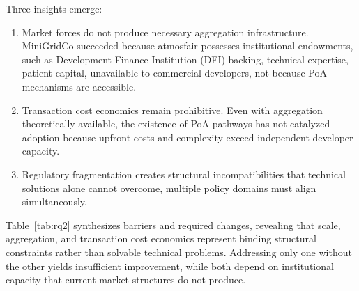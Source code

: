 Three insights emerge:
\begin{enumerate}
	\item Market forces do not produce necessary aggregation infrastructure. MiniGridCo succeeded because atmosfair possesses institutional endowments, such as Development Finance Institution (DFI) backing, technical expertise, patient capital, unavailable to commercial developers, not because PoA mechanisms are accessible.
	\item Transaction cost economics remain prohibitive. Even with aggregation theoretically available, the existence of PoA pathways has not catalyzed adoption because upfront costs and complexity exceed independent developer capacity.
	\item Regulatory fragmentation creates structural incompatibilities that technical solutions alone cannot overcome, multiple policy domains must align simultaneously.
\end{enumerate}

Table~\ref{tab:rq2} synthesizes barriers and required changes, revealing that scale, aggregation, and transaction cost economics represent binding structural constraints rather than solvable technical problems. Addressing only one without the other yields insufficient improvement, while both depend on institutional capacity that current market structures do not produce.

